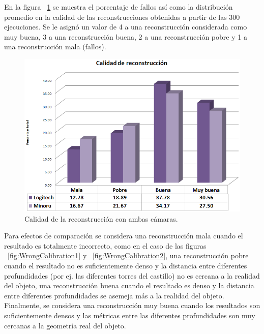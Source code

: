 En la figura ~\ref{fig:CalibrationQuality} se muestra el porcentaje de fallos as\'{i} como la distribuci\'{o}n promedio en la calidad de las reconstrucciones obtenidas a partir de las 300 ejecuciones. Se le asign\'{o} un valor de 4 a una reconstrucci\'{o}n considerada como muy buena, 3 a una reconstrucci\'{o}n buena, 2 a una reconstrucci\'{o}n pobre y 1 a una reconstrucci\'{o}n mala (fallos).


\begin{figure}[H]
\centering
\includegraphics[width=1.0\textwidth]{images/calibquality1.png}
\caption[Calidad de la reconstrucci\'{o}n con ambas c\'{a}maras.]%
{Calidad de la reconstrucci\'{o}n con ambas c\'{a}maras.}
\label{fig:CalibrationQuality}
\end{figure}


Para efectos de comparaci\'{o}n se considera una reconstrucci\'{o}n mala cuando el resultado es totalmente incorrecto, como en el caso de las figuras ~\ref{fig:WrongCalibration1} y ~\ref{fig:WrongCalibration2}, una reconstrucci\'{o}n pobre cuando el resultado no es suficientemente denso y la distancia entre diferentes profundidades (por ej. las diferentes torres del castillo) no es cercana a la realidad del objeto, una reconstrucci\'{o}n buena cuando el resultado es denso y la distancia entre diferentes profundidades se asemeja m\'{a}s a la realidad del objeto. Finalmente, se considera una reconstrucci\'{o}n muy buena cuando los resultados son suficientemente densos y las m\'{e}tricas entre las diferentes profundidades son muy cercanas a la geometr\'{i}a real del objeto.



